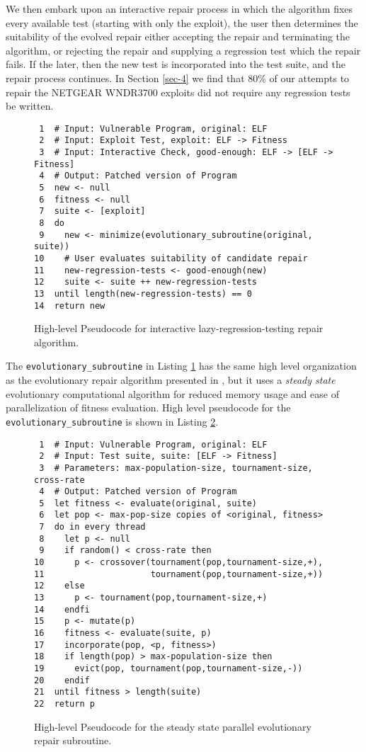 \documentclass{sigcomm-alternate}
\begin{document}
We then embark upon an interactive repair process in which the
algorithm fixes every available test (starting with only the exploit),
the user then determines the suitability of the evolved repair either
accepting the repair and terminating the algorithm, or rejecting the
repair and supplying a regression test which the repair fails.  If the
later, then the new test is incorporated into the test suite, and the
repair process continues.  In Section \ref{sec-4} we find that 80\% of our
attempts to repair the NETGEAR WNDR3700 exploits did not require any
regression tests be written.

\begin{figure}[H]
\begin{verbatim}
 1  # Input: Vulnerable Program, original: ELF
 2  # Input: Exploit Test, exploit: ELF -> Fitness
 3  # Input: Interactive Check, good-enough: ELF -> [ELF -> Fitness]
 4  # Output: Patched version of Program
 5  new <- null
 6  fitness <- null
 7  suite <- [exploit]
 8  do
 9    new <- minimize(evolutionary_subroutine(original, suite))
10    # User evaluates suitability of candidate repair
11    new-regression-tests <- good-enough(new)
12    suite <- suite ++ new-regression-tests
13  until length(new-regression-tests) == 0
14  return new
\end{verbatim}\caption{\label{lazy-algorithm}High-level Pseudocode for interactive lazy-regression-testing repair algorithm.}

\end{figure}

The \texttt{evolutionary\_subroutine} in Listing \ref{lazy-algorithm} has the same
high level organization as the evolutionary repair algorithm presented
in \cite{forrest2009genetic}, but it uses a \emph{steady state} evolutionary
computational algorithm \cite{Luke2013Metaheuristics} for reduced memory
usage and ease of parallelization of fitness evaluation.  High level
pseudocode for the \texttt{evolutionary\_subroutine} is shown in Listing
\ref{evolutionary-subroutine}.

\begin{figure}[H]
\begin{verbatim}
 1  # Input: Vulnerable Program, original: ELF
 2  # Input: Test suite, suite: [ELF -> Fitness]
 3  # Parameters: max-population-size, tournament-size, cross-rate
 4  # Output: Patched version of Program
 5  let fitness <- evaluate(original, suite)
 6  let pop <- max-pop-size copies of <original, fitness>
 7  do in every thread
 8    let p <- null
 9    if random() < cross-rate then
10      p <- crossover(tournament(pop,tournament-size,+),
11                     tournament(pop,tournament-size,+))
12    else
13      p <- tournament(pop,tournament-size,+)
14    endfi
15    p <- mutate(p)
16    fitness <- evaluate(suite, p)
17    incorporate(pop, <p, fitness>)
18    if length(pop) > max-population-size then
19      evict(pop, tournament(pop,tournament-size,-))
20    endif
21  until fitness > length(suite)
22  return p
\end{verbatim}\caption{\label{evolutionary-subroutine}High-level Pseudocode for the steady state parallel evolutionary repair subroutine.}

\end{figure}
\end{document}

